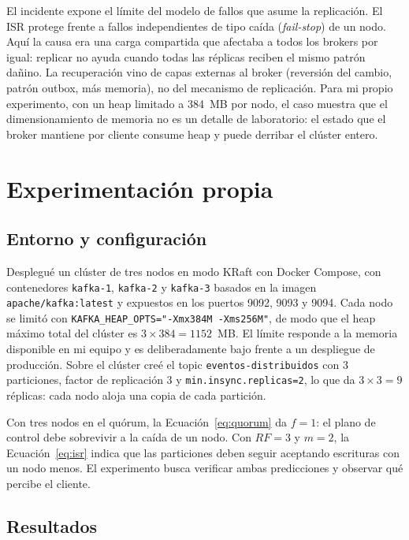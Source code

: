 \documentclass[11pt,a4paper]{article}
\begin{document}
El incidente expone el límite del modelo de fallos que asume la replicación. El ISR protege frente a fallos independientes de tipo caída (\emph{fail-stop}) de un nodo. Aquí la causa era una carga compartida que afectaba a todos los brokers por igual: replicar no ayuda cuando todas las réplicas reciben el mismo patrón dañino. La recuperación vino de capas externas al broker (reversión del cambio, patrón outbox, más memoria), no del mecanismo de replicación. Para mi propio experimento, con un heap limitado a 384~MB por nodo, el caso muestra que el dimensionamiento de memoria no es un detalle de laboratorio: el estado que el broker mantiene por cliente consume heap y puede derribar el clúster entero.

\section{Experimentación propia}
\label{sec:experimento}

\subsection{Entorno y configuración}

Desplegué un clúster de tres nodos en modo KRaft con Docker Compose, con contenedores \texttt{kafka-1}, \texttt{kafka-2} y \texttt{kafka-3} basados en la imagen \texttt{apache/kafka:latest} y expuestos en los puertos 9092, 9093 y 9094. Cada nodo se limitó con \texttt{KAFKA\_HEAP\_OPTS="-Xmx384M -Xms256M"}, de modo que el heap máximo total del clúster es $3 \times 384 = 1152$~MB. El límite responde a la memoria disponible en mi equipo y es deliberadamente bajo frente a un despliegue de producción. Sobre el clúster creé el topic \texttt{eventos-distribuidos} con 3 particiones, factor de replicación 3 y \texttt{min.insync.replicas=2}, lo que da $3 \times 3 = 9$ réplicas: cada nodo aloja una copia de cada partición.

Con tres nodos en el quórum, la Ecuación~\eqref{eq:quorum} da $f=1$: el plano de control debe sobrevivir a la caída de un nodo. Con $RF=3$ y $m=2$, la Ecuación~\eqref{eq:isr} indica que las particiones deben seguir aceptando escrituras con un nodo menos. El experimento busca verificar ambas predicciones y observar qué percibe el cliente.

\subsection{Resultados}
\end{document}
